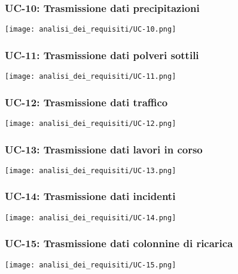 \subsubsection{UC-10: Trasmissione dati precipitazioni}
\begin{center}
	\texttt{[image: analisi\_dei\_requisiti/UC-10.png]}
\end{center}

\subsubsection{UC-11: Trasmissione dati polveri sottili}
\begin{center}
	\texttt{[image: analisi\_dei\_requisiti/UC-11.png]}
\end{center}

\subsubsection{UC-12: Trasmissione dati traffico}
\begin{center}
	\texttt{[image: analisi\_dei\_requisiti/UC-12.png]}
\end{center}

\subsubsection{UC-13: Trasmissione dati lavori in corso}
\begin{center}
	\texttt{[image: analisi\_dei\_requisiti/UC-13.png]}
\end{center}

\subsubsection{UC-14: Trasmissione dati incidenti}
\begin{center}
	\texttt{[image: analisi\_dei\_requisiti/UC-14.png]}
\end{center}

\subsubsection{UC-15: Trasmissione dati colonnine di ricarica}
\begin{center}
	\texttt{[image: analisi\_dei\_requisiti/UC-15.png]}
\end{center}

